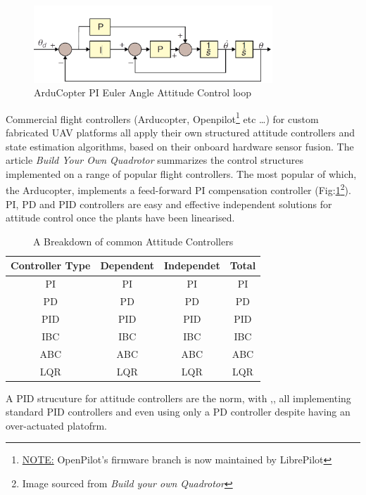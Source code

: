 \par
\begin{figure}[hbtp]
\centering
\includegraphics[width=0.8\textwidth]{figs/arducopter-pi}
\caption{ArduCopter PI Euler Angle Attitude Control loop}
\label{fig:arducopter-pi}
\end{figure}
Commercial flight controllers (Arducopter\cite{arducoptersite}, Openpilot\cite{openpilotsite}\footnote{\underline{NOTE:} OpenPilot's firmware branch is now maintained by LibrePilot} etc \ldots) for custom fabricated UAV platforms all apply their own structured attitude controllers and state estimation algorithms, based on their onboard hardware sensor fusion. The article \emph{Build Your Own Quadrotor}\cite{buildyourownquad} summarizes the control structures implemented on a range of popular flight controllers. The most popular of which, the Arducopter, implements a feed-forward PI compensation controller (Fig:\ref{fig:arducopter-pi}\footnote{Image sourced from \emph{Build your own Quadrotor}\cite{buildyourownquad}}).  PI, PD and PID controllers are easy and effective independent solutions for attitude control once the plants have been linearised.
\begin{table}[h]
\centering
\begin{tabular}{ |c|c|c|c| }
\hline
Controller Type & Dependent & Independet & Total\\ \hline
PI & PI & PI & PI\\ \hline
PD & PD & PD & PD\\ \hline
PID & PID & PID & PID\\ \hline
IBC & IBC & IBC & IBC\\ \hline
ABC & ABC & ABC & ABC\\ \hline
LQR & LQR & LQR & LQR\\ \hline
\end{tabular}
\caption{A Breakdown of common Attitude Controllers}
\label{tab:controllers}
\end{table}
\par
A PID strucuture for attitude controllers are the norm, with \cite{optimizedPID},\cite{quaddynamics},\cite{tiltpropellerflight} all implementing standard PID controllers and even \cite{singleaxistilting} using only a PD controller despite having an over-actuated platofrm. 
